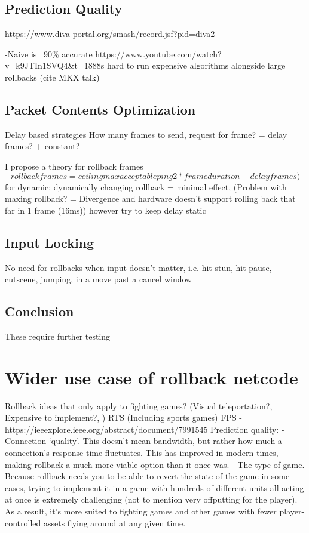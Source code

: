 \documentclass{entcs}
\begin{document}
\subsection{Prediction Quality}
https://www.diva-portal.org/smash/record.jsf?pid=diva2%

-Naive is ~90\% accurate {https://www.youtube.com/watch?v=k9JTIn1SVQ4\&t=1888s}
hard to run expensive algorithms alongside large rollbacks (cite MKX talk)

\subsection{Packet Contents Optimization}
Delay based strategies
How many frames to send, request for frame? = delay frames? + constant?

I propose a theory for rollback frames 
\[rollback frames = ceiling{max acceptable ping}{2*frameduration} - delay frames)\]
for dynamic: dynamically changing rollback = minimal effect, (Problem with maxing rollback? = Divergence and hardware doesn't support rolling back that far in 1 frame (16ms))
however try to keep delay static \cite{sec:Industry Issues}

\subsection{Input Locking}
No need for rollbacks when input doesn't matter, i.e. hit stun, hit pause, cutscene, jumping, in a move past a cancel window \cite{sec:Industry Issues}

\subsection{Conclusion}
These require further testing

\section{Wider use case of rollback netcode}
Rollback ideas that only apply to fighting games? (Visual teleportation?, Expensive to implement?, ) 
 RTS (Including sports games)
FPS - https://ieeexplore.ieee.org/abstract/document/7991545
Prediction quality:
- Connection ‘quality’. This doesn’t mean bandwidth, but rather how much a connection’s response time fluctuates. This has improved in modern times, making rollback a much more viable option than it once was.
- The type of game. Because rollback needs you to be able to revert the state of the game in some cases, trying to implement it in a game with hundreds of different units all acting at once is extremely challenging (not to mention very offputting for the player). As a result, it’s more suited to fighting games and other games with fewer player-controlled assets flying around at any given time.
\end{document}
